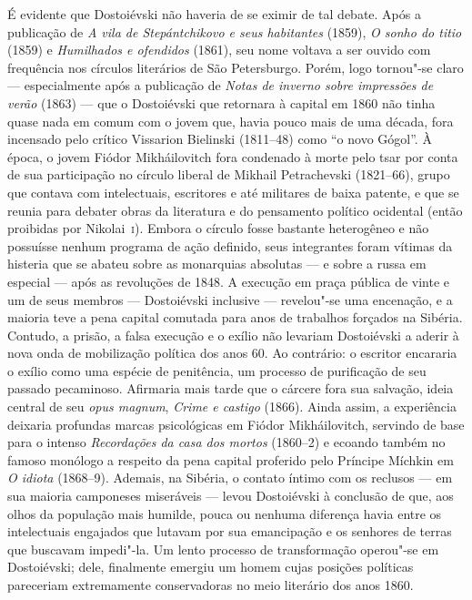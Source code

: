 É evidente que Dostoiévski não haveria de se eximir de tal debate. Após a
publicação de \textit{A vila de Stepántchikovo e seus habitantes} (1859),
\textit{O sonho do titio} (1859) e \textit{Humilhados e ofendidos} (1861), seu
nome voltava a ser ouvido com frequência nos círculos literários de São
Petersburgo. Porém, logo tornou"-se claro --- especialmente após a publicação de
\textit{Notas de inverno sobre impressões de verão} (1863) --- que o Dostoiévski
que retornara à capital em 1860 não tinha quase nada em comum com o jovem que,
havia pouco mais de uma década, fora incensado pelo crítico Vissarion Bielinski
(1811--48) como “o novo Gógol”. À época, o jovem Fiódor Mikháilovitch fora
condenado à morte pelo tsar por conta de sua participação no círculo liberal de
Mikhail Petrachevski (1821--66), grupo que contava com intelectuais, escritores
e até militares de baixa patente, e que se reunia para debater obras da
literatura e do pensamento político ocidental (então proibidas por Nikolai~\textsc{i}).
Embora o círculo fosse bastante heterogêneo e não possuísse nenhum programa de
ação definido, seus integrantes foram vítimas da histeria que se abateu sobre as
monarquias absolutas --- e sobre a russa em especial --- após as revoluções de
1848. A execução em praça pública de vinte e um de seus membros --- Dostoiévski
inclusive --- revelou"-se uma encenação, e a maioria teve a pena capital comutada
para anos de trabalhos forçados na Sibéria.  Contudo, a prisão, a falsa
execução e o exílio não levariam Dostoiévski a aderir à nova onda de
mobilização política dos anos 60. Ao contrário: o escritor encararia o exílio
como uma espécie de penitência, um processo de purificação de seu passado
pecaminoso. Afirmaria mais tarde que o cárcere fora sua salvação, ideia central
de seu \textit{opus magnum}, \textit{Crime e castigo} (1866). Ainda assim, a
experiência deixaria profundas marcas psicológicas em Fiódor Mikháilovitch,
servindo de base para o intenso \textit{Recordações da casa dos mortos}
(1860--2) e ecoando também no famoso monólogo a respeito da pena capital
proferido pelo Príncipe Míchkin em \textit{O idiota} (1868--9). Ademais, na
Sibéria, o contato íntimo com os reclusos --- em sua maioria camponeses
miseráveis --- levou Dostoiévski à conclusão de que, aos olhos da população mais
humilde, pouca ou nenhuma diferença havia entre os intelectuais engajados que
lutavam por sua emancipação e os senhores de terras que buscavam impedi"-la. Um
lento processo de transformação operou"-se em Dostoiévski; dele, finalmente
emergiu um homem cujas posições políticas pareceriam extremamente conservadoras
no meio literário dos anos 1860.

